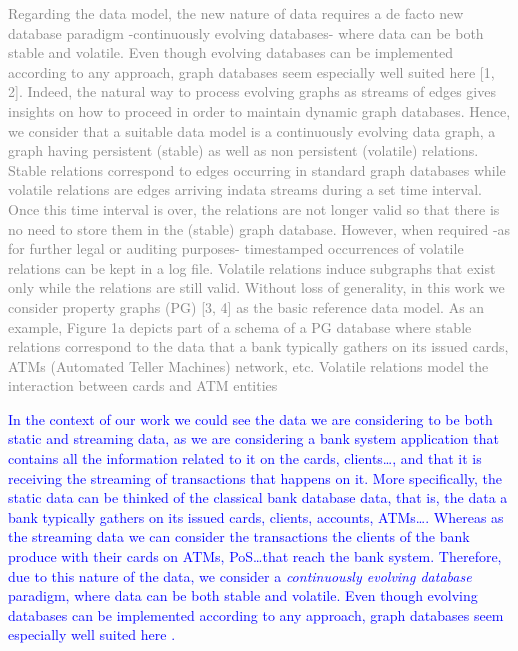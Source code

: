 \textcolor{gray}{
Regarding the data model, the new nature of data requires a de facto new database paradigm
-continuously evolving databases- where data can be both stable and volatile. Even though
evolving databases can be implemented according to any approach, graph databases seem
especially well suited here [1, 2]. Indeed, the natural way to process evolving graphs as streams
of edges gives insights on how to proceed in order to maintain dynamic graph databases. Hence,
we consider that a suitable data model is a continuously evolving data graph, a graph having
persistent (stable) as well as non persistent (volatile) relations. Stable relations correspond
to edges occurring in standard graph databases while volatile relations are edges arriving indata streams during a set time interval. Once this time interval is over, the relations are not
longer valid so that there is no need to store them in the (stable) graph database. However,
when required -as for further legal or auditing purposes- timestamped occurrences of volatile
relations can be kept in a log file. Volatile relations induce subgraphs that exist only while the
relations are still valid. Without loss of generality, in this work we consider property graphs
(PG) [3, 4] as the basic reference data model. As an example, Figure 1a depicts part of a schema
of a PG database where stable relations correspond to the data that a bank typically gathers
on its issued cards, ATMs (Automated Teller Machines) network, etc. Volatile relations model
the interaction between cards and ATM entities}


\textcolor{blue}{In the context of our work we could see the data we are considering to be both static and streaming data, as we are considering a bank system application that contains all the information related to it on the cards, clients\dots, and that it is receiving the streaming of transactions that happens on it.
More specifically, the static data can be thinked of the classical bank database data, that is, the data a bank typically gathers on its issued cards, clients, accounts, ATMs\dots. Whereas as the streaming data we can consider the transactions the clients of the bank produce with their cards on ATMs, PoS\dots that reach the bank system.
Therefore, due to this nature of the data, we consider a \emph{continuously evolving database} paradigm, where data can be both stable and volatile. Even though 
evolving databases can be implemented according to any approach, graph databases seem especially well suited here \textcolor{blue}{\cite{angles2008survey, kumar2015graph}}. 
}


